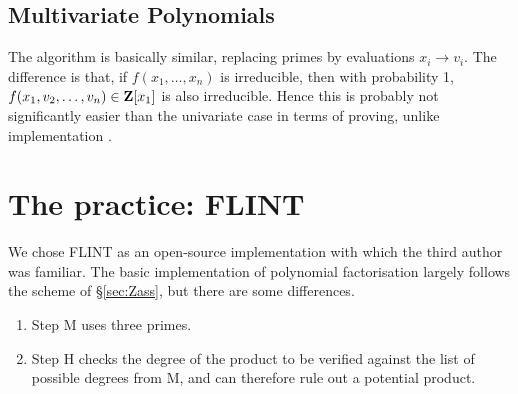 \documentclass{llncs}
\begin{document}
\subsection{Multivariate Polynomials}
The algorithm is basically similar, replacing primes by evaluations $x_i\rightarrow v_i$.  The difference is that, if $f(x_1,\ldots,x_n)$ is irreducible, then with probability 1, $f(x_1,v_2,\ldots,v_n)\in{\bf Z}[x_1]$ is also irreducible. Hence this is probably not significantly easier than the univariate case in terms of proving, unlike implementation \cite{MooreNorman1981}.
\section{The practice: FLINT}
We chose FLINT \cite{Flint2023a} as an open-source implementation with which the third author was familiar. The basic implementation of polynomial factorisation largely follows the scheme of \S\ref{sec:Zass}, but there are some differences.
\begin{enumerate}
\item Step M uses three primes.
\item Step H checks the degree of the product to be verified against the list of possible degrees from M, and can therefore rule out a potential product.
\end{enumerate}
\end{document}
